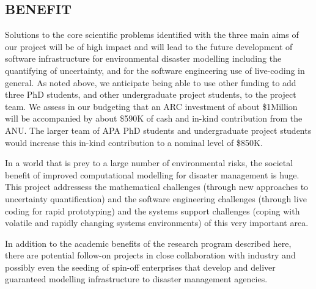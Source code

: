 \subsection*{BENEFIT}


Solutions to the core scientific problems identified with the three main aims of our project will be of high impact and will lead to the future development of  software infrastructure for environmental disaster modelling including the quantifying of uncertainty, and for the software engineering use of live-coding in general. As noted above, we anticipate being able to use other funding to add three PhD students, and other undergraduate project students, to the project team. We assess in our budgeting that an ARC investment of about  \$1Million will be accompanied by about  \$590K of cash and in-kind contribution from the ANU. The larger team of APA PhD students and undergraduate project students would increase this in-kind contribution to a nominal level of \$850K. 
  

In a world that is prey to a large number of environmental risks,
the societal benefit of improved computational modelling for disaster management is huge.
This project addressess the mathematical challenges (through new approaches
to uncertainty quantification) and the software engineering challenges (through live coding
 for rapid prototyping) and the systems support challenges (coping with volatile and 
 rapidly changing systems environments) of this very important area.
 
In addition to the academic benefits of the research program described here, there are potential follow-on projects in close
collaboration with industry and possibly even the seeding of spin-off enterprises that develop and deliver guaranteed modelling infrastructure to disaster management
agencies.

\iffalse
This research is aims to unlock the power of sophisticated
computational simulation incorporating uncertainty for
\emph{interactive} use.  Although we concentrate our research on
simulation support for disaster response, the ultimate potential of
this work is to eventually empower domain experts from a broad range
of areas to better use the high-performance computing power which is
now available to them. We envision a future where performing a complex
flood model or disaster simulation is as interactive and \emph{alive}
as flicking through photos on a tablet.\\



There are several benefits arising from the successful completion of
this project. They include, economic, societal as well as
environmental along with the generation of new knowledge:
\begin{itemize}
\item Reduced economic losses from disasters such as flooding
\item Reduced property damage from disasters
\item Reduced loss of life from disasters
\item New knowledge in the understanding of disaster modelling, and
  hence forecasting.
\end{itemize}
\fi